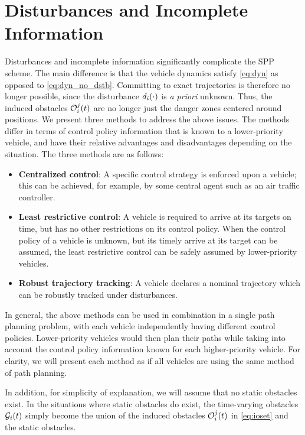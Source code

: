 \section{Disturbances and Incomplete Information \label{sec:incomp}}
Disturbances and incomplete information significantly complicate the SPP scheme. The main difference is that the vehicle dynamics satisfy \eqref{eq:dyn} as opposed to \eqref{eq:dyn_no_dstb}. Committing to exact trajectories is therefore no longer possible, since the disturbance $d_i(\cdot)$ is \textit{a priori} unknown. Thus, the induced obstacles $\mathcal{O}_i^j(t)$ are no longer just the danger zones centered around positions. We present three methods to address the above issues. The methods differ in terms of control policy information that is known to a lower-priority vehicle, and have their relative advantages and disadvantages depending on the situation. The three methods are as follows:
\begin{itemize}
\item \textbf{Centralized control}: A specific control strategy is enforced upon a vehicle; this can be achieved, for example, by some central agent such as an air traffic controller.
\item \textbf{Least restrictive control}: A vehicle is required to arrive at its targets on time, but has no other restrictions on its control policy. When the control policy of a vehicle is unknown, but its timely arrive at its target can be assumed, the least restrictive control can be safely assumed by lower-priority vehicles.
\item \textbf{Robust trajectory tracking}: A vehicle declares a nominal trajectory which can be robustly tracked under disturbances.
\end{itemize}

In general, the above methods can be used in combination in a single path planning problem, with each vehicle independently having different control policies. Lower-priority vehicles would then plan their paths while taking into account the control policy information known for each higher-priority vehicle. For clarity, we will present each method as if all vehicles are using the same method of path planning.

In addition, for simplicity of explanation, we will assume that no static obstacles exist. In the situations where static obstacles do exist, the time-varying obstacles $\mathcal{G}_i(t)$ simply become the union of the induced obstacles $\mathcal{O}_i^j(t)$ in \eqref{eq:ioset} and the static obstacles.

